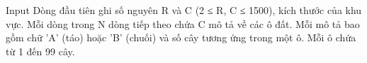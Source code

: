 Input
Dòng đầu tiên ghi số nguyên R và C (2 ≤ R, C ≤ 1500), kích thước của khu vực. Mỗi dòng trong N dòng tiếp theo chứa C mô tả về các ô đất. Mỗi mô tả bao gồm chữ 'A' (táo) hoặc 'B' (chuối) và số cây tương ứng trong một ô. Mỗi ô chứa từ 1 đến 99 cây.